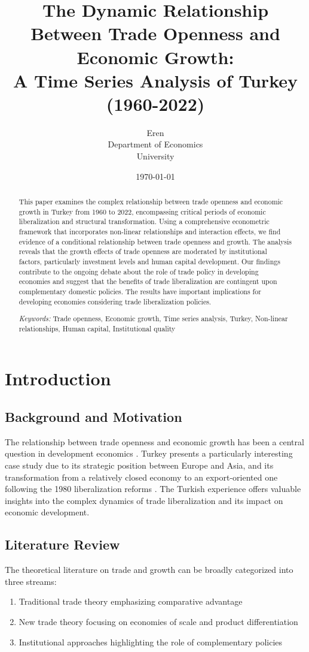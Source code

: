 \documentclass[12pt,a4paper]{article}
\title{The Dynamic Relationship Between Trade Openness and Economic Growth: \\
A Time Series Analysis of Turkey (1960-2022)}
\author{Eren\\
\small{Department of Economics}\\
\small{University}}
\date{\today}
\theoremstyle{definition}
\begin{document}
\maketitle

\begin{abstract}
This paper examines the complex relationship between trade openness and economic growth in Turkey from 1960 to 2022, encompassing critical periods of economic liberalization and structural transformation. Using a comprehensive econometric framework that incorporates non-linear relationships and interaction effects, we find evidence of a conditional relationship between trade openness and growth. The analysis reveals that the growth effects of trade openness are moderated by institutional factors, particularly investment levels and human capital development. Our findings contribute to the ongoing debate about the role of trade policy in developing economies and suggest that the benefits of trade liberalization are contingent upon complementary domestic policies. The results have important implications for developing economies considering trade liberalization policies.

\textit{Keywords:} Trade openness, Economic growth, Time series analysis, Turkey, Non-linear relationships, Human capital, Institutional quality
\end{abstract}

\section{Introduction}
\subsection{Background and Motivation}
The relationship between trade openness and economic growth has been a central question in development economics \citep{rodriguez1999trade, sachs1995economic}. Turkey presents a particularly interesting case study due to its strategic position between Europe and Asia, and its transformation from a relatively closed economy to an export-oriented one following the 1980 liberalization reforms \citep{pamuk2008economic}. The Turkish experience offers valuable insights into the complex dynamics of trade liberalization and its impact on economic development.

\subsection{Literature Review}
The theoretical literature on trade and growth can be broadly categorized into three streams:
\begin{enumerate}
    \item Traditional trade theory emphasizing comparative advantage \citep{edwards1998openness}
    \item New trade theory focusing on economies of scale and product differentiation \citep{krugman1979increasing}
    \item Institutional approaches highlighting the role of complementary policies \citep{acemoglu2005institutions}
\end{enumerate}
\end{document}
